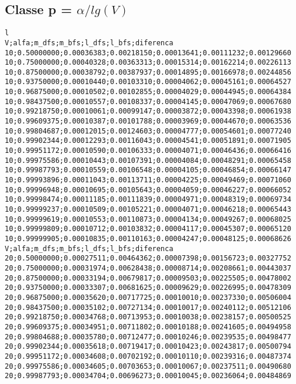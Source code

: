 \documentclass[brazil,times]{abnt}
\begin{document}
\subsection*{Classe p = $\alpha/lg(V)$}
{\scriptsize \begin{verbatim}
l
V;alfa;m_dfs;m_bfs;l_dfs;l_bfs;diferenca
10;0.50000000;0.00036383;0.00218150;0.00013641;0.00111232;0.00129660
10;0.75000000;0.00040328;0.00363313;0.00015314;0.00162214;0.00226113
10;0.87500000;0.00038792;0.00387937;0.00014895;0.00166978;0.00244856
10;0.93750000;0.00010440;0.00103310;0.00004062;0.00045161;0.00064527
10;0.96875000;0.00010502;0.00102855;0.00004029;0.00044945;0.00064384
10;0.98437500;0.00010557;0.00108337;0.00004145;0.00047069;0.00067680
10;0.99218750;0.00010061;0.00099147;0.00003872;0.00043398;0.00061938
10;0.99609375;0.00010387;0.00101788;0.00003969;0.00044670;0.00063536
10;0.99804687;0.00012015;0.00124603;0.00004777;0.00054601;0.00077240
10;0.99902344;0.00012293;0.00116043;0.00004541;0.00051891;0.00071905
10;0.99951172;0.00010590;0.00106333;0.00004071;0.00046436;0.00066416
10;0.99975586;0.00010443;0.00107391;0.00004084;0.00048291;0.00065458
10;0.99987793;0.00010559;0.00106548;0.00004105;0.00046854;0.00066147
10;0.99993896;0.00011043;0.00113711;0.00004225;0.00049469;0.00071060
10;0.99996948;0.00010695;0.00105643;0.00004059;0.00046227;0.00066052
10;0.99998474;0.00011185;0.00111839;0.00004971;0.00048319;0.00069734
10;0.99999237;0.00010509;0.00105221;0.00004071;0.00046218;0.00065443
10;0.99999619;0.00010553;0.00110873;0.00004134;0.00049267;0.00068025
10;0.99999809;0.00010712;0.00103832;0.00004117;0.00045307;0.00065120
10;0.99999905;0.00010835;0.00110163;0.00004247;0.00048125;0.00068626
V;alfa;m_dfs;m_bfs;l_dfs;l_bfs;diferenca
20;0.50000000;0.00027511;0.00464362;0.00007398;0.00156723;0.00327752
20;0.75000000;0.00031974;0.00628438;0.00008714;0.00208661;0.00443037
20;0.87500000;0.00033194;0.00679817;0.00009503;0.00225505;0.00478002
20;0.93750000;0.00033307;0.00681625;0.00009629;0.00226995;0.00478309
20;0.96875000;0.00035620;0.00717725;0.00010010;0.00237330;0.00506004
20;0.98437500;0.00035102;0.00727134;0.00010017;0.00240112;0.00512106
20;0.99218750;0.00034768;0.00713953;0.00010038;0.00238157;0.00500525
20;0.99609375;0.00034951;0.00711802;0.00010188;0.00241605;0.00494958
20;0.99804688;0.00035780;0.00712477;0.00010246;0.00239535;0.00498477
20;0.99902344;0.00035618;0.00719417;0.00010423;0.00243817;0.00500794
20;0.99951172;0.00034608;0.00702192;0.00010110;0.00239316;0.00487374
20;0.99975586;0.00034605;0.00703653;0.00010067;0.00237511;0.00490680
20;0.99987793;0.00034704;0.00696273;0.00010045;0.00236064;0.00484869

\end{verbatim}}
\end{document}
